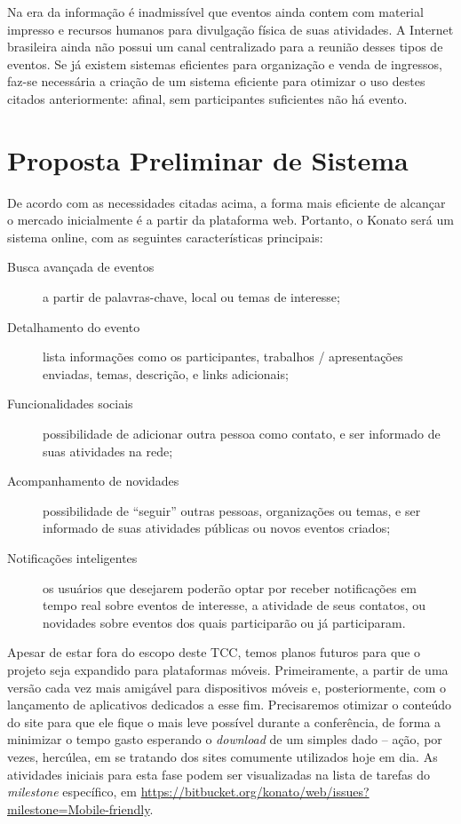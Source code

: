 \documentclass[12pt,a4paper,twoside,hyphens,english,brazil]{abntex2}
\begin{document}
Na era da informação é inadmissível que eventos ainda contem com material impresso e recursos humanos para divulgação física de suas atividades. A Internet brasileira ainda não possui um canal centralizado para a reunião desses tipos de eventos. Se já existem sistemas eficientes para organização e venda de ingressos, faz-se necessária a criação de um sistema eficiente para otimizar o uso destes citados anteriormente: afinal, sem participantes suficientes não há evento.

\chapter{Proposta Preliminar de Sistema}
De acordo com as necessidades citadas acima, a forma mais eficiente de alcançar o mercado inicialmente é a partir da plataforma web. Portanto, o Konato será um sistema online, com as seguintes características principais:

\begin{description}
	\item[Busca avançada de eventos] a partir de palavras-chave, local ou temas de interesse;
	\item[Detalhamento do evento] lista informações como os participantes, trabalhos / apresentações enviadas, temas, descrição, e links adicionais;
	\item[Funcionalidades sociais] possibilidade de adicionar outra pessoa como contato, e ser informado de suas atividades na rede;
	\item[Acompanhamento de novidades] possibilidade de ``seguir'' outras pessoas, organizações ou temas, e ser informado de suas atividades públicas ou novos eventos criados;
	\item[Notificações inteligentes] os usuários que desejarem poderão optar por receber notificações em tempo real sobre eventos de interesse, a atividade de seus contatos, ou novidades sobre eventos dos quais participarão ou já participaram.
\end{description}

Apesar de estar fora do escopo deste TCC, temos planos futuros para que o projeto seja expandido para plataformas móveis. Primeiramente, a partir de uma versão cada vez mais amigável para dispositivos móveis e, posteriormente, com o lançamento de aplicativos dedicados a esse fim. Precisaremos otimizar o conteúdo do site para que ele fique o mais leve possível durante a conferência, de forma a minimizar o tempo gasto esperando o \emph{download} de um simples dado -- ação, por vezes, hercúlea, em se tratando dos sites comumente utilizados hoje em dia. As atividades iniciais para esta fase podem ser visualizadas na lista de tarefas do \emph{milestone} específico, em \mbox{\url{https://bitbucket.org/konato/web/issues?milestone=Mobile-friendly}}.
\end{document}

